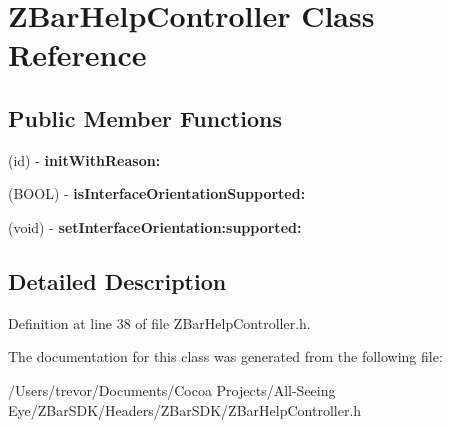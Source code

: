 \hypertarget{interface_z_bar_help_controller}{
\section{ZBarHelpController Class Reference}
\label{interface_z_bar_help_controller}
}
\subsection*{Public Member Functions}
\begin{DoxyCompactItemize}
\item 
\hypertarget{interface_z_bar_help_controller_ad6beca4507530d6ce573fe1afe94accc}{
(id) -\/ {\bfseries initWithReason:}}
\label{interface_z_bar_help_controller_ad6beca4507530d6ce573fe1afe94accc}

\item 
\hypertarget{interface_z_bar_help_controller_a883f99f0c378230953138322a4c08916}{
(BOOL) -\/ {\bfseries isInterfaceOrientationSupported:}}
\label{interface_z_bar_help_controller_a883f99f0c378230953138322a4c08916}

\item 
\hypertarget{interface_z_bar_help_controller_a3699129834faa3dbe63dcfce4c586fb8}{
(void) -\/ {\bfseries setInterfaceOrientation:supported:}}
\label{interface_z_bar_help_controller_a3699129834faa3dbe63dcfce4c586fb8}

\end{DoxyCompactItemize}


\subsection{Detailed Description}


Definition at line 38 of file ZBarHelpController.h.



The documentation for this class was generated from the following file:\begin{DoxyCompactItemize}
\item 
/Users/trevor/Documents/Cocoa Projects/All-\/Seeing Eye/ZBarSDK/Headers/ZBarSDK/ZBarHelpController.h\end{DoxyCompactItemize}
